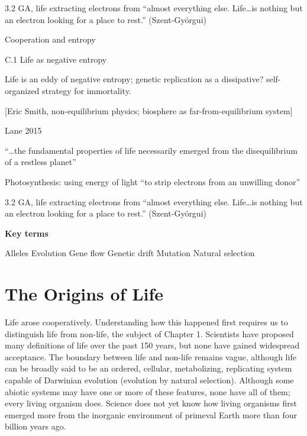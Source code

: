 \documentclass{tufte-book} %
\begin{document}
3.2 GA, life extracting electrons from “almost everything else. Life…is nothing but an electron looking for a place to rest.” (Szent-Györgui)


Cooperation and entropy

C.1 Life as negative entropy

Life is an eddy of negative entropy; genetic replication as a dissipative? self-organized strategy for immortality.

[Eric Smith, non-equilibrium physics; biosphere as far-from-equilibrium system]

Lane 2015

“…the fundamental properties of life necessarily emerged from the disequilibrium of a restless planet”

Photosynthesis: using energy of light “to strip electrons from an unwilling donor”

3.2 GA, life extracting electrons from “almost everything else. Life…is nothing but an electron looking for a place to rest.” (Szent-Györgui)


\textbf{Key terms}

Alleles
Evolution
Gene flow
Genetic drift
Mutation
Natural selection




\chapter{The Origins of Life}\label{ch:origins}

Life arose cooperatively. Understanding how this happened first requires us to distinguish life from non-life, the subject of Chapter 1. Scientists have proposed many definitions of life over the past 150 years, but none have gained widespread acceptance. The boundary between life and non-life remains vague, although life can be broadly said to be an ordered, cellular, metabolizing, replicating system capable of Darwinian evolution (evolution by natural selection). Although some abiotic systems may have one or more of these features, none have all of them; every living organism does. Science does not yet know how living organisms first emerged more from the inorganic environment of primeval Earth more than four billion years ago.
\end{document}
